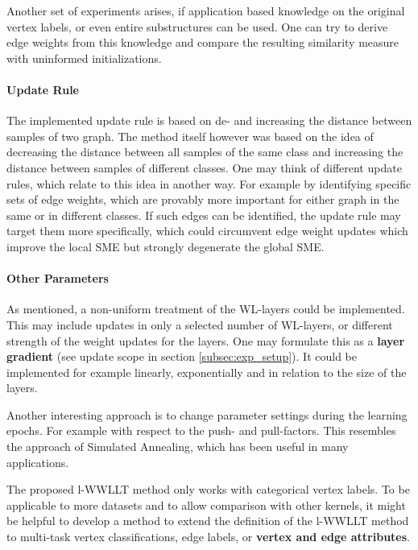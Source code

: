    	Another set of experiments arises, if application based knowledge on the original vertex labels, or even entire substructures can be used.
   	One can try to derive edge weights from this knowledge and compare the resulting similarity measure with uninformed initializations.
   	
    \paragraph{Update Rule}
    The implemented update rule is based on de- and increasing the distance between samples of two graph.
    The method itself however was based on the idea of decreasing the distance between all samples of the same class and increasing the distance between samples of different classes.
    One may think of different update rules, which relate to this idea in another way.
    For example by identifying specific sets of edge weights, which are provably more important for either graph in the same or in different classes.
    If such edges can be identified, the update rule may target them more specifically, which could circumvent edge weight updates which improve the local SME but strongly degenerate the global SME.    
   	
	\paragraph{Other Parameters}    
   	As mentioned, a non-uniform treatment of the WL-layers could be implemented.
   	This may include updates in only a selected number of WL-layers, or different strength of the weight updates for the layers.
   	One may formulate this as a \textbf{layer gradient} (see update scope in section \ref{subsec:exp_setup}).
   	It could be implemented for example linearly, exponentially and in relation to the size of the layers.
   	
   	Another interesting approach is to change parameter settings during the learning epochs.
   	For example with respect to the push- and pull-factors.
   	This resembles the approach of Simulated Annealing, which has been useful in many applications.
   	
   	The proposed l-WWLLT method only works with categorical vertex labels.
   	To be applicable to more datasets and to allow comparison with other kernels, it might be helpful to develop a method to extend the definition of the l-WWLLT method to multi-task vertex classifications, edge labels, or \textbf{vertex and edge attributes}.
   	
